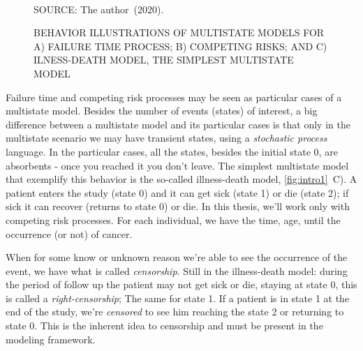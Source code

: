\begin{figure}[H]
  \setlength{\abovecaptionskip}{.0001pt}
  \caption{BEHAVIOR ILLUSTRATIONS OF MULTISTATE MODELS FOR A) FAILURE
    TIME PROCESS; B) COMPETING RISKS; AND C) ILNESS-DEATH MODEL, THE
    SIMPLEST MULTISTATE MODEL}
  \vspace{0.425cm} \centering
  \\
  \vspace{0.45cm}
  \begin{footnotesize}
    SOURCE: The author~(2020).
  \end{footnotesize}
  \label{fig:intro1}
\end{figure}

Failure time and competing risk processes may be seen as particular
cases of a multistate model. Besides the number of events (states) of
interest, a big difference between a multistate model and its particular
cases is that only in the multistate scenario we may have transient
states, using a \textit{stochastic process} language. In the particular
cases, all the states, besides the initial state 0, are absorbents -
once you reached it you don't leave. The simplest multistate model that
exemplify this behavior is the so-called illness-death model,
\autoref{fig:intro1}~C). A patient enters the study (state 0) and it can
get sick (state 1) or die (state 2); if sick it can recover (returns to
state 0) or die. In this thesis, we'll work only with competing risk
processes. For each individual, we have the time, age, until the
occurrence (or not) of cancer.

When for some know or unknown reason we're able to see the occurrence of
the event, we have what is called \textit{censorship}. Still in the
illness-death model: during the period of follow up the patient may not
get sick or die, staying at state 0, this is called a
\textit{right-censorship}; The same for state 1. If a patient is in
state 1 at the end of the study, we're \textit{censored} to see him
reaching the state 2 or returning to state 0. This is the inherent idea
to censorship and must be present in the modeling framework.

